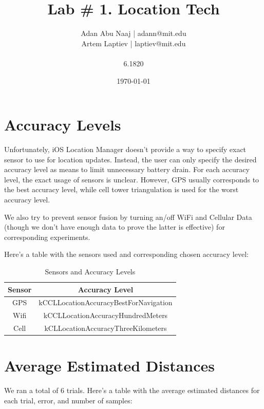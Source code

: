 \documentclass{lab}
\title{Lab \# 1. Location Tech} %
\author{Adan Abu Naaj | adann@mit.edu \\ Artem Laptiev | laptiev@mit.edu \\\\ 6.1820} %
\date{\today} %
\begin{document}
\maketitle

\newpage

\section{Accuracy Levels}

Unfortunately, iOS Location Manager doesn't provide a way to specify exact sensor to use for location updates. Instead, the user can only specify the desired accuracy level as means to limit unnecessary battery drain. For each accuracy level, the exact usage of sensors is unclear. However, GPS usually corresponds to the best accuracy level, while cell tower triangulation is used for the worst accuracy level.

We also try to prevent sensor fusion by turning an/off WiFi and Cellular Data (though we don't have enough data to prove the latter is effective) for corresponding experiments.

Here's a table with the sensors used and corresponding chosen accuracy level:

\begin{table}[h!]
    \centering
    \begin{tabular}{|c|c|}
        \hline
        \textbf{Sensor} & \textbf{Accuracy Level} \\ \hline
        GPS & kCCLLocationAccuracyBestForNavigation \\ \hline
        Wifi & kCCLLocationAccuracyHundredMeters \\ \hline
        Cell & kCLLocationAccuracyThreeKilometers \\ \hline
    \end{tabular}
    \caption{Sensors and Accuracy Levels}
    \label{tab:accuracy}
\end{table}

\section{Average Estimated Distances}

We ran a total of 6 trials. Here's a table with the average estimated distances for each trial, error, and number of samples:
\end{document}
